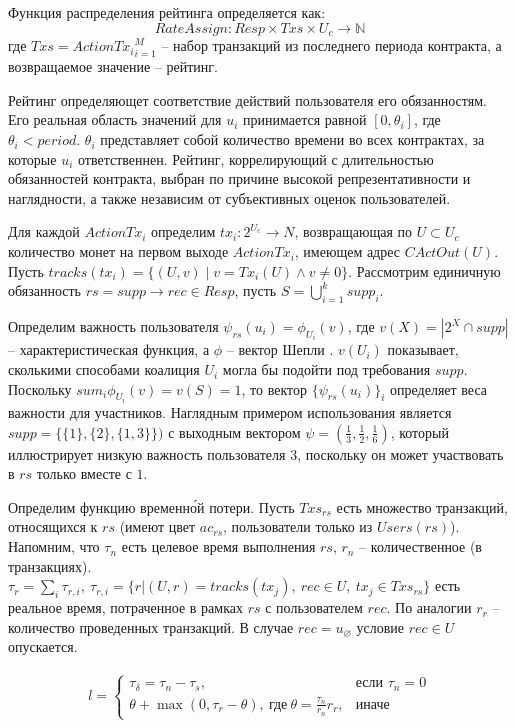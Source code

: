 \documentclass[specification,annotation]{itmo-student-thesis}
\begin{document}
Функция распределения рейтинга определяется как:
\[RateAssign : Resp \times Txs \times U_c \rightarrow \mathbb{N}\]
где $Txs = {ActionTx_i}_{i=1}^M$ -- набор транзакций из последнего
периода контракта, а возвращаемое значение -- рейтинг.

Рейтинг определяющет соответствие действий пользователя его
обязанностям. Его реальная область значений для $u_i$ принимается
равной $[0,\theta_i]$, где $\theta_i < period$. $\theta_i$ представляет
собой количество времени во всех контрактах, за которые $u_i$
ответственнен. Рейтинг, коррелирующий с длительностью обязанностей
контракта, выбран по причине высокой репрезентативности и наглядности,
а также независим от субъективных оценок пользователей.

Для каждой $ActionTx_i$ определим $tx_i : 2^{U_c} \rightarrow N$,
возвращающая по $U \subset U_c$ количество монет на первом выходе
$ActionTx_i$, имеющем адрес $CActOut(U)$. Пусть $tracks(tx_i) = \{
(U,v) \mid v = Tx_i(U) \wedge v \neq 0 \}$. Рассмотрим единичную обязанность $rs =
supp \rightarrow rec \in Resp$, пусть $S = \bigcup_{i=1}^{k}{supp_i}$.

Определим важность пользователя $\psi_{rs}(u_i) = \phi_{U_i}(v)$, где
$v(X) = |2^X \cap supp|$ -- характеристическая функция, а $\phi$ --
вектор Шепли \cite{shapley} \cite{petrosyan}. $v(U_i)$ показывает,
сколькими способами коалиция $U_i$ могла бы подойти под требования
$supp$. Поскольку $sum_i{\phi_{U_i}(v)} = v(S) = 1$, то вектор
$\{\psi_{rs}(u_i)\}_i$ определяет веса важности для
участников. Наглядным примером использования является $supp =
\{\{1\},\{2\},\{1,3\}\})$ с выходным вектором $\psi = (\frac{1}{3},
\frac{1}{2}, \frac{1}{6})$, который иллюстрирует низкую важность
пользователя $3$, поскольку он может участвовать в $rs$ только вместе
с $1$.

Определим функцию временн\'{о}й потери. Пусть $Txs_{rs}$ есть
множество транзакций, относящихся к $rs$ (имеют цвет $ac_{rs}$,
пользователи только из $Users(rs)$). Напомним, что $\tau_n$ есть
целевое время выполнения $rs$, $r_n$ -- количественное (в
транзакциях). $\tau_r = \sum_i{\tau_{r,i}},\ \tau_{r,i} = \{r | (U,r)
= tracks(tx_j),\ rec \in U, \ tx_j \in Txs_{rs}\}$ есть реальное время,
  потраченное в рамках $rs$ с пользователем $rec$. По аналогии $r_r$
  -- количество проведенных транзакций. В случае $rec =
  u_{\varnothing}$ условие $rec \in U$ опускается.

\begin{align*}
l =
\begin{cases}
  \tau_{\delta} = \tau_n - \tau_s, & \text{если } \tau_n = 0 \\
  \theta + \max{(0, \tau_r - \theta)}, \ \text{где} \ \theta = \frac{\tau_n}{r_n}r_r, & \text{иначе}
\end{cases}
\end{align*}
\end{document}
